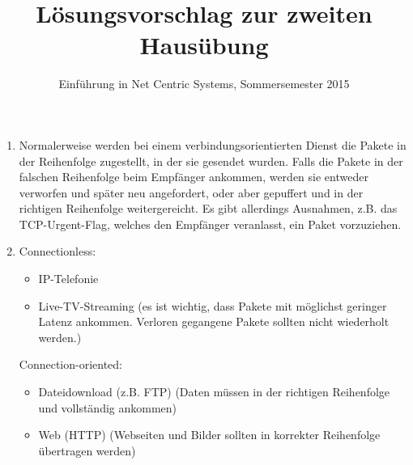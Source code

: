 \documentclass[a4paper,
			llpt,
			solution,
			accentcolor=tud2d,
			colorbacktitle
			]
			{tudexercise}
\title{Lösungsvorschlag zur zweiten Hausübung}
\subtitle{Einführung in Net Centric Systems, Sommersemester 2015}
\begin{document}
\maketitle

\section{}


\begin{enumerate}

\item
Normalerweise werden bei einem verbindungsorientierten Dienst die Pakete in der Reihenfolge zugestellt, in der sie gesendet wurden. Falls die Pakete in der falschen Reihenfolge beim Empfänger ankommen, werden sie entweder verworfen und später neu angefordert, oder aber gepuffert und in der richtigen Reihenfolge weitergereicht.
Es gibt allerdings Ausnahmen, z.B. das TCP-Urgent-Flag, welches den Empfänger veranlasst, ein Paket vorzuziehen.

\item
Connectionless:
\begin{itemize}
\item IP-Telefonie
\item Live-TV-Streaming
(es ist wichtig, dass Pakete mit möglichst geringer Latenz ankommen. Verloren gegangene Pakete sollten nicht wiederholt werden.)
\end{itemize}
Connection-oriented:
\begin{itemize}
\item Dateidownload (z.B. FTP)
(Daten müssen in der richtigen Reihenfolge und vollständig ankommen)
\item Web (HTTP)
(Webseiten und Bilder sollten in korrekter Reihenfolge übertragen werden)
\end{itemize}
\end{enumerate}
\end{document}
